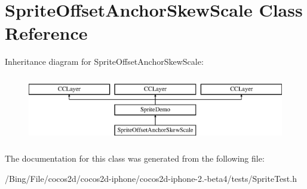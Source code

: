 \hypertarget{interface_sprite_offset_anchor_skew_scale}{\section{Sprite\-Offset\-Anchor\-Skew\-Scale Class Reference}
\label{interface_sprite_offset_anchor_skew_scale}
}
Inheritance diagram for Sprite\-Offset\-Anchor\-Skew\-Scale\-:\begin{figure}[H]
\begin{center}
\leavevmode
\includegraphics[height=2.931937cm]{interface_sprite_offset_anchor_skew_scale}
\end{center}
\end{figure}


The documentation for this class was generated from the following file\-:\begin{DoxyCompactItemize}
\item 
/\-Bing/\-File/cocos2d/cocos2d-\/iphone/cocos2d-\/iphone-\/2.-\/beta4/tests/Sprite\-Test.\-h\end{DoxyCompactItemize}
